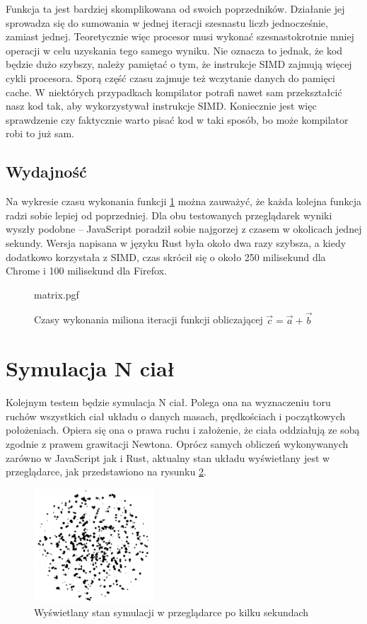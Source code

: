 \documentclass[language=polish,type=master]{aghmodern}
\begin{document}
Funkcja ta jest bardziej skomplikowana od swoich poprzedników.
Działanie jej sprowadza się do sumowania w jednej iteracji szesnastu liczb jednocześnie, zamiast jednej.
Teoretycznie więc procesor musi wykonać szesnastokrotnie mniej operacji w celu uzyskania tego samego wyniku.
Nie oznacza to jednak, że kod będzie dużo szybszy, należy pamiętać o tym, że instrukcje SIMD zajmują więcej cykli procesora.
Sporą część czasu zajmuje też wczytanie danych do pamięci cache.
W niektórych przypadkach kompilator potrafi nawet sam przekształcić nasz kod tak, aby wykorzystywał instrukcje SIMD.
Koniecznie jest więc sprawdzenie czy faktycznie warto pisać kod w taki sposób, bo może kompilator robi to już sam.

\subsection{Wydajność}
Na wykresie czasu wykonania funkcji \ref{fig:matrix} można zauważyć, że każda kolejna funkcja radzi sobie lepiej od poprzedniej.
Dla obu testowanych przeglądarek wyniki wyszły podobne -- JavaScript poradził sobie najgorzej z czasem w okolicach jednej sekundy.
Wersja napisana w języku Rust była około dwa razy szybsza, a kiedy dodatkowo korzystała z SIMD, czas skrócił się o około 250 milisekund dla Chrome i 100 milisekund dla Firefox.

\begin{figure}[H]
    \centering
    {matrix.pgf}
    \caption{Czasy wykonania miliona iteracji funkcji obliczającej $\vec{c} = \vec{a} + \vec{b}$}
    \label{fig:matrix}
\end{figure}

\section{Symulacja N ciał}
Kolejnym testem będzie symulacja N ciał.
Polega ona na wyznaczeniu toru ruchów wszystkich ciał układu o danych masach, prędkościach i początkowych położeniach.
Opiera się ona o prawa ruchu i założenie, że ciała oddziałują ze sobą zgodnie z prawem grawitacji Newtona.
Oprócz samych obliczeń wykonywanych zarówno w JavaScript jak i Rust, aktualny stan układu wyświetlany jest w przeglądarce, jak przedstawiono na rysunku \ref{fig:nbody_screenshot}. 

\begin{figure}[H]
    \centering
    \includegraphics[width=0.4\textwidth]{images/nbody.pdf}
    \vspace*{10pt}
    \caption{Wyświetlany stan symulacji w przeglądarce po kilku sekundach}
    \label{fig:nbody_screenshot}
\end{figure}
\end{document}
